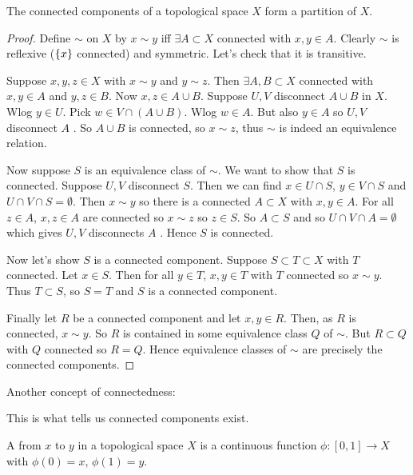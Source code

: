 \begin{theorem} \label{thm:45}
    The connected components of a topological space $X$ form a partition of $X$.
\end{theorem}

\begin{proof}
    Define $\sim$ on $X$ by $x\sim y$ iff $\exists A\subset X$ connected with $x,y \in A$. 
    Clearly $\sim$ is reflexive ($\{x\}$ connected) and symmetric. 
    Let's check that it is transitive.

    Suppose $x,y,z\in X$ with $x\sim y$ and $y\sim z$. 
    Then $\exists A,B\subset X$ connected with $x,y\in A$ and $y,z\in B$. Now $x,z\in A\cup B$. Suppose $U,V$ disconnect $A\cup B$ in $X$. 
    Wlog $y\in U$. Pick $w\in V\cap(A\cup B)$. 
    Wlog $w\in A$. But also $y\in A$ so $U,V$ disconnect $A$ \Lightning.
    So $A\cup B$ is connected, so $x\sim z$, thus $\sim$ is indeed an equivalence relation.

    Now suppose $S$ is an equivalence class of $\sim$. 
    We want to show that $S$ is connected. 
    Suppose $U,V$ disconnect $S$. Then we can find $x\in U\cap S$, $y\in V\cap S$ and $U\cap V\cap S = \emptyset$. 
    Then $x\sim y$ so there is a connected $A\subset X$ with $x,y\in A$. 
    For all $z\in A$, $x,z\in A$ are connected so $x\sim z$ so $z\in S$. 
    So $A\subset S$ and so $U\cap V\cap A = \emptyset$ which gives $U,V$ disconnects $A$ \Lightning. 
    Hence $S$ is connected.

    Now let's show $S$ is a connected component. Suppose $S\subset T\subset X$ with $T$ connected. 
    Let $x\in S$. Then for all $y\in T$, $x,y\in T$ with $T$ connected so $x\sim y$. 
    Thus $T\subset S$, so $S=T$ and $S$ is a connected component.

    Finally let $R$ be a connected component and let $x,y\in R$. Then, as $R$ is connected, $x \sim y$. 
    So $R$ is contained in some equivalence class $Q$ of $\sim$. 
    But $R\subset Q$ with $Q$ connected so $R=Q$. Hence equivalence classes of $\sim$ are precisely the connected components.
\end{proof}

Another concept of connectedness:
\begin{remark}
    This is what tells us connected components exist.
\end{remark} 

\begin{definition}[Paths]
    A  from $x$ to $y$ in a topological space $X$ is a continuous function $\phi:[0,1]\to X$ with $\phi(0) = x$, $\phi(1) = y$.
\end{definition}

